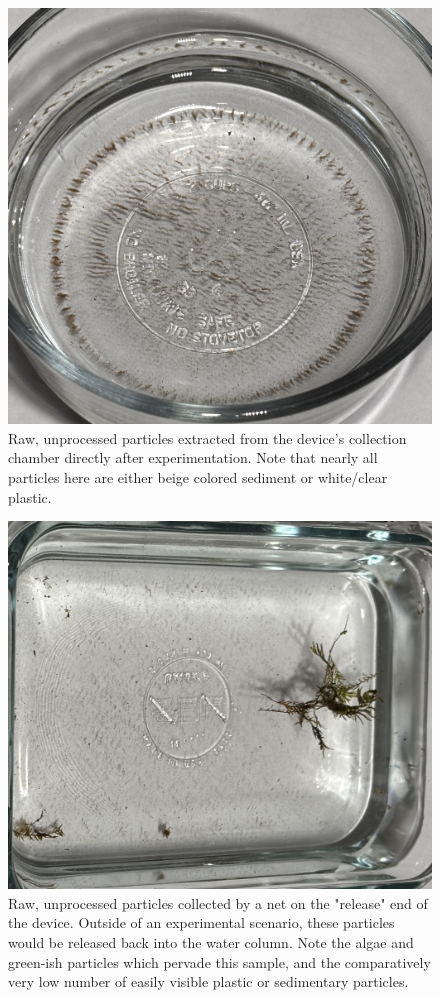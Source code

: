 \documentclass[fleqn,10pt]{SelfArx} %
\begin{document}
	\begin{figure}[H]
		\centering
		\includegraphics[width=1\linewidth]{Figures/RawSeparated}
		\caption[Raw Separated Plastics]{Raw, unprocessed particles extracted from the device's collection chamber directly after experimentation. Note that nearly all particles here are either beige colored sediment or white/clear plastic.}
		\label{fig:rawseparated}
	\end{figure}
	
	\begin{figure}[H]
		\centering
		\includegraphics[angle=90,origin=c,width=1\linewidth]{Figures/RawReleased}
		\caption[Raw Released Particles]{Raw, unprocessed particles collected by a net on the "release" end of the device. Outside of an experimental scenario, these particles would be released back into the water column. Note the algae and green-ish particles which pervade this sample, and the comparatively very low number of easily visible plastic or sedimentary particles.}
		\label{fig:rawreleased}
	\end{figure}
	
\end{document}
